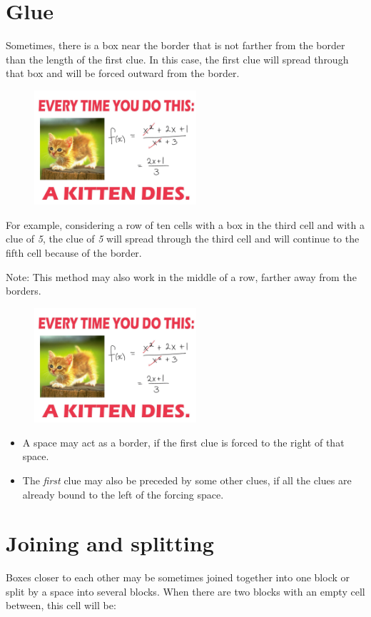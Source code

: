 \section{Glue}
Sometimes, there is a box near the border that is not farther from the border than the length of the first clue. In this case, the first clue will spread through that box and will be forced outward from the border.
\begin{figure}
\centering
\includegraphics[width=6cm]{picture/obr.jpg}
\end{figure}
For example, considering a row of ten cells with a box in the third cell and with a clue of \textit{5}, the clue of \textit{5} will spread through the third cell and will continue to the fifth cell because of the border.

Note: This method may also work in the middle of a row, farther away from the borders.
\begin{figure}
\centering
\includegraphics[width=6cm]{picture/obr.jpg}
\end{figure}

\begin{itemize} 
 \item {A space may act as a border, if the first clue is forced to the right of that space.}

\item {The \textit{first} clue may also be preceded by some other clues, if all the clues are already bound to the left of the forcing space.} 
\end{itemize}



\section{Joining and splitting}
Boxes closer to each other may be sometimes joined together into one block or split by a space into several blocks. When there are two blocks with an empty cell between, this cell will be:

